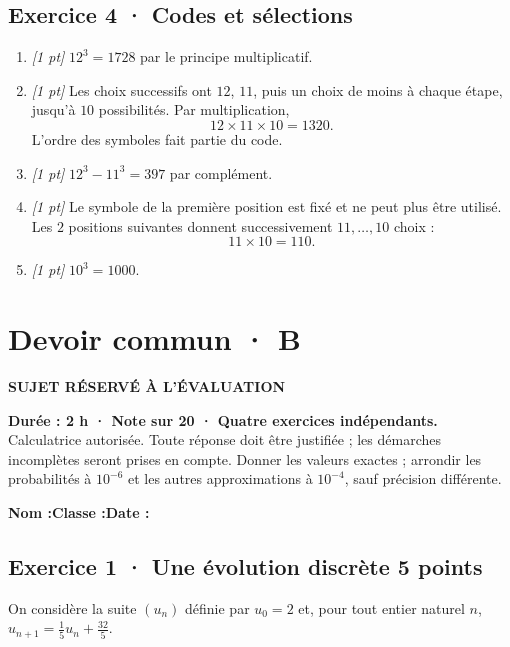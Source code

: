 \subsection*{Exercice 4 · Codes et sélections}\begin{enumerate}

\item \textit{[1 pt]} $12^3=1728$ par le principe multiplicatif.

\item \textit{[1 pt]} Les choix successifs ont $12$, $11$, puis un choix de moins à chaque étape, jusqu'à $10$ possibilités. Par multiplication,
\[12\times11\times10=1320.\]
L'ordre des symboles fait partie du code.

\item \textit{[1 pt]} $12^3-11^3=397$ par complément.

\item \textit{[1 pt]} Le symbole de la première position est fixé et ne peut plus être utilisé. Les $2$ positions suivantes donnent successivement $11,\ldots,10$ choix :
\[11\times10=110.\]

\item \textit{[1 pt]} $10^3=1000$.

\end{enumerate}

\fi

\fi

\ifmxteacher

\mxnewpage{}\label{sujet:3-4}

\section*{Devoir commun · B}

{\sffamily\bfseries\color{mxwarn}SUJET RÉSERVÉ À L'ÉVALUATION\par}

\textbf{Durée : 2 h · Note sur 20 · Quatre exercices indépendants.}\\Calculatrice autorisée. Toute réponse doit être justifiée ; les démarches incomplètes seront prises en compte. Donner les valeurs exactes ; arrondir les probabilités à $10^{-6}$ et les autres approximations à $10^{-4}$, sauf précision différente.

\smallskip\textbf{Nom :}\enspace\dotfill\quad\textbf{Classe :}\enspace\dotfill\quad\textbf{Date :}\enspace\dotfill

\subsection*{Exercice 1 · Une évolution discrète \hfill 5 points}On considère la suite $(u_n)$ définie par $u_0=2$ et, pour tout entier naturel $n$, $u_{n+1}=\frac{1}{5}u_n+\frac{32}{5}$.

